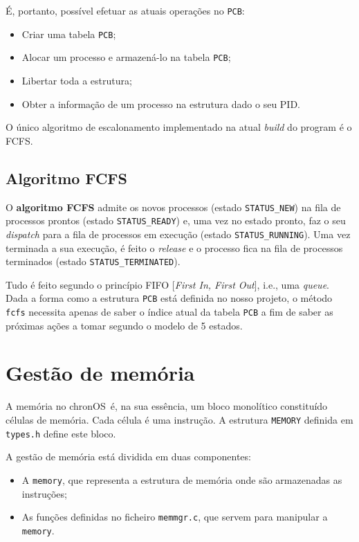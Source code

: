 \documentclass[a4paper,11pt,onecolumn,oneside]{article}
\newcommand{\chronOS}{\textsf{chronOS}}
\begin{document}
	É, portanto, possível efetuar as atuais operações no \verb|PCB|:
	\begin{itemize}
	    \item Criar uma tabela \verb|PCB|;
	    \item Alocar um processo e armazená-lo na tabela \verb|PCB|;
	    \item Libertar toda a estrutura;
	    \item Obter a informação de um processo na estrutura dado o seu PID.
	\end{itemize}
	
	O único algoritmo de escalonamento implementado na atual \textit{build} do program é o \ac{FCFS}.
	
	
	\subsection{Algoritmo FCFS}
	\label{ssec:process:fcfs}
	
	O \textbf{algoritmo FCFS} admite os novos processos (estado \texttt{STATUS\_NEW}) na fila de processos prontos (estado \texttt{STATUS\_READY}) e, uma vez no estado pronto, faz o seu \textit{dispatch} para a fila de processos em execução (estado \texttt{STATUS\_RUNNING}). Uma vez terminada a sua execução, é feito o \textit{release} e o processo fica na fila de processos terminados (estado \texttt{STATUS\_TERMINATED}).
	
	Tudo é feito segundo o princípio FIFO [\textit{First In, First Out}], i.e., uma \textit{queue}. Dada a forma como a estrutura \verb|PCB| está definida no nosso projeto, o método \verb|fcfs| necessita apenas de saber o índice atual da tabela \verb|PCB| a fim de saber as próximas ações a tomar segundo o modelo de 5 estados.
	
	
	\section{Gestão de memória}
	\label{sec:memory}
	
	A memória no \chronOS~é, na sua essência, um bloco monolítico constituído células de memória. Cada célula é uma instrução. A estrutura \verb|MEMORY| definida em \texttt{types.h} define este bloco.
	
	A gestão de memória está dividida em duas componentes:
	\begin{itemize}
		\item A \verb|memory|, que representa a estrutura de memória onde são armazenadas as instruções;
		\item As funções definidas no ficheiro \verb|memmgr.c|, que servem para manipular a \verb|memory|.
	\end{itemize}
	
\end{document}
